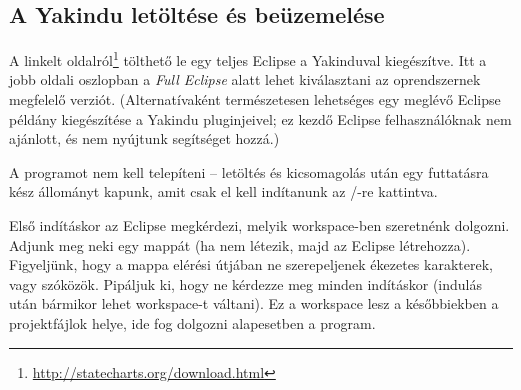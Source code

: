 \begin{comment}
Telepítés után érdemes beállítani a \codeEsc{JAVA\_HOME} változót, valamint hozzáadni a Java elérési útját a PATH-hoz. Ehhez Windowson a követketzőt kell tenni.

\begin{itemize}
\item A számítógép ikonra jobb gombal kattintva válasszuk a \textbf{Properties} (Tulajdonságok) lehetőséget. (Elérhető a \textbf{Control Panel} | \textbf{System and Security} | \textbf{System} úton is.)
\item A bal oldali menü lehetőségei közül kattintsunk az \\textbf{Advanced System Settings}-re.
\item Itt nyomjunk rá az \textbf{Environment Variables} gombra.
\item Ha még nincs \codeEsc{JAVA_HOME} változó, létre kell hozni. \codeEsc{JAVA_HOME} legyen a neve, az értéke pedig a frissen installált Java könyvtár elérési útja. Ha szóközöket tartalmaz, érdemes rövidítéseket használni, pl. \codeEsc{C:\Progra~1\Java\jdk1.8.0\_31}
\item Jelöljük ki a \codeEsc{Path} változót, majd \textbf{Edit}. A változó jelenlegi értékét ne töröljük ki, csak írjunk a végére egy pontosvesszőt, majd a JDK-n belüli bin könyvtár elérési útját.
\end{itemize}
\end{comment}

\subsection{A Yakindu letöltése és beüzemelése}

A linkelt oldalról\footnote{\url{http://statecharts.org/download.html}} tölthető le egy teljes Eclipse a Yakinduval kiegészítve. Itt a jobb oldali oszlopban a \emph{Full Eclipse} alatt lehet kiválasztani az oprendszernek megfelelő verziót. (Alternatívaként természetesen lehetséges egy meglévő Eclipse példány kiegészítése a Yakindu pluginjeivel; ez kezdő Eclipse felhasználóknak nem ajánlott, és nem nyújtunk segítséget hozzá.)

A programot nem kell telepíteni -- letöltés és kicsomagolás után egy futtatásra kész állományt kapunk, amit csak el kell indítanunk az /-re kattintva.

Első indításkor az Eclipse megkérdezi, melyik workspace-ben szeretnénk dolgozni. Adjunk meg neki egy mappát (ha nem létezik, majd az Eclipse létrehozza). Figyeljünk, hogy a mappa elérési útjában ne szerepeljenek ékezetes karakterek, vagy szóközök. Pipáljuk ki, hogy ne kérdezze meg minden indításkor (indulás után bármikor lehet workspace-t váltani).
Ez a workspace lesz a későbbiekben a projektfájlok helye, ide fog dolgozni alapesetben a program.

